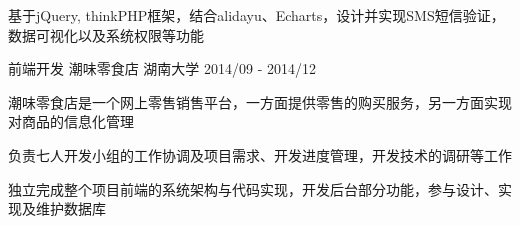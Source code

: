 \begin{cventries}
{\begin{cvitems}
        \item {基于jQuery, thinkPHP框架，结合alidayu、Echarts，设计并实现SMS短信验证，数据可视化以及系统权限等功能}
      \end{cvitems}
    }
  \cventry
    {前端开发}
    {潮味零食店}
    {湖南大学}
    {2014/09 - 2014/12}
    {
      \begin{cvitems}
        \item {潮味零食店是一个网上零售销售平台，一方面提供零售的购买服务，另一方面实现对商品的信息化管理}
        \item {负责七人开发小组的工作协调及项目需求、开发进度管理，开发技术的调研等工作}
        \item {独立完成整个项目前端的系统架构与代码实现，开发后台部分功能，参与设计、实现及维护数据库}
      \end{cvitems}
    }
\end{cventries}
